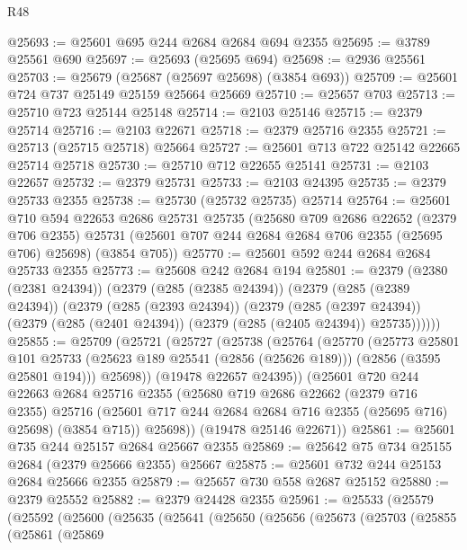 \begin{lexlean}{R48}
\begin{coremodule}
@25693 := @25601 @695 @244 @2684 @2684 @694 @2355
@25695 := @3789 @25561 @690
@25697 := @25693 (@25695 @694)
@25698 := @2936 @25561
@25703 := @25679 (@25687 (@25697 @25698) (@3854 @693))
@25709 := @25601 @724 @737 @25149 @25159 @25664 @25669
@25710 := @25657 @703
@25713 := @25710 @723 @25144 @25148
@25714 := @2103 @25146
@25715 := @2379 @25714
@25716 := @2103 @22671
@25718 := @2379 @25716 @2355
@25721 := @25713 (@25715 @25718) @25664
@25727 := @25601 @713 @722 @25142 @22665 @25714 @25718
@25730 := @25710 @712 @22655 @25141
@25731 := @2103 @22657
@25732 := @2379 @25731
@25733 := @2103 @24395
@25735 := @2379 @25733 @2355
@25738 := @25730 (@25732 @25735) @25714
@25764 := @25601
    @710
    @594
    @22653
    @2686
    @25731
    @25735
    (@25680
      @709
      @2686
      @22652
      (@2379 @706 @2355)
      @25731
      (@25601 @707 @244 @2684 @2684 @706 @2355 (@25695 @706) @25698)
      (@3854 @705))
@25770 := @25601 @592 @244 @2684 @2684 @25733 @2355
@25773 := @25608 @242 @2684 @194
@25801 := @2379
    (@2380 (@2381 @24394))
    (@2379
      (@285 (@2385 @24394))
      (@2379
        (@285 (@2389 @24394))
        (@2379
          (@285 (@2393 @24394))
          (@2379
            (@285 (@2397 @24394))
            (@2379 (@285 (@2401 @24394)) (@2379 (@285 (@2405 @24394)) @25735))))))
@25855 := @25709
    (@25721
      (@25727
        (@25738
          (@25764
            (@25770
              (@25773
                @25801
                @101
                @25733
                (@25623 @189 @25541 (@2856 (@25626 @189)))
                (@2856 (@3595 @25801 @194)))
              @25698))
          (@19478 @22657 @24395))
        (@25601
          @720
          @244
          @22663
          @2684
          @25716
          @2355
          (@25680
            @719
            @2686
            @22662
            (@2379 @716 @2355)
            @25716
            (@25601 @717 @244 @2684 @2684 @716 @2355 (@25695 @716) @25698)
            (@3854 @715))
          @25698))
      (@19478 @25146 @22671))
@25861 := @25601 @735 @244 @25157 @2684 @25667 @2355
@25869 := @25642 @75 @734 @25155 @2684 (@2379 @25666 @2355) @25667
@25875 := @25601 @732 @244 @25153 @2684 @25666 @2355
@25879 := @25657 @730 @558 @2687 @25152
@25880 := @2379 @25552
@25882 := @2379 @24428 @2355
@25961 := @25533
    (@25579
      (@25592
        (@25600
          (@25635
            (@25641
              (@25650
                (@25656
                  (@25673
                    (@25703
                      (@25855
                        (@25861
                          (@25869

\end{coremodule}
\end{lexlean}

